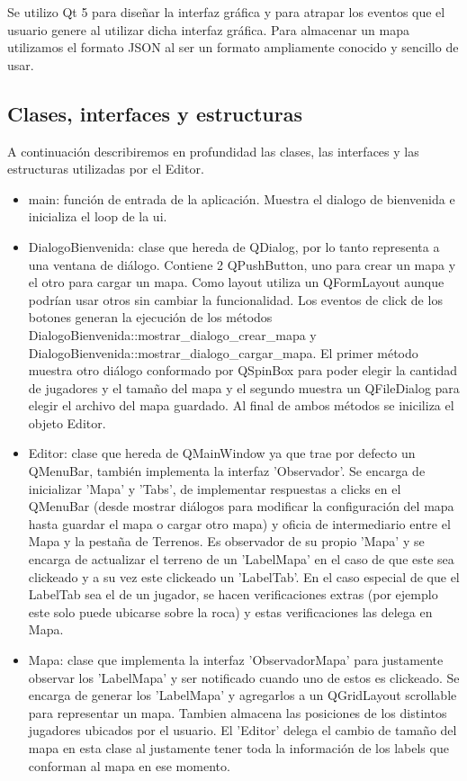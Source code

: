 \documentclass[titlepage,a4paper,12pt]{article}
\begin{document}
Se utilizo Qt 5 para diseñar la interfaz gráfica y para atrapar los eventos que el usuario genere al utilizar dicha interfaz gráfica. Para almacenar un mapa utilizamos el formato JSON al ser un formato ampliamente conocido y sencillo de usar.

\subsection{Clases, interfaces y estructuras}

A continuación describiremos en profundidad las clases, las interfaces y las estructuras utilizadas por el Editor.

\begin{itemize}

\item main: función de entrada de la aplicación. Muestra el dialogo de bienvenida e inicializa el loop de la ui.

\item DialogoBienvenida: clase que hereda de QDialog, por lo tanto representa a una ventana de diálogo. Contiene 2 QPushButton, uno para crear un mapa y el otro para cargar un mapa. Como layout utiliza un QFormLayout aunque podrían usar otros sin cambiar la funcionalidad. Los eventos de click de los botones generan la ejecución de los métodos DialogoBienvenida::mostrar\_dialogo\_crear\_mapa y DialogoBienvenida::mostrar\_dialogo\_cargar\_mapa. El primer método muestra otro diálogo conformado por QSpinBox para poder elegir la cantidad de jugadores y el tamaño del mapa y el segundo muestra un QFileDialog para elegir el archivo del mapa guardado. Al final de ambos métodos se iniciliza el objeto Editor.

\item Editor: clase que hereda de QMainWindow ya que trae por defecto un QMenuBar, también implementa la interfaz 'Observador'. Se encarga de inicializar 'Mapa' y 'Tabs', de implementar respuestas a clicks en el QMenuBar (desde mostrar diálogos para modificar la configuración del mapa hasta guardar el mapa o cargar otro mapa) y oficia de intermediario entre el Mapa y la pestaña de Terrenos. Es observador de su propio 'Mapa' y se encarga de actualizar el terreno de un 'LabelMapa' en el caso de que este sea clickeado y a su vez este clickeado un 'LabelTab'. En el caso especial de que el LabelTab sea el de un jugador, se hacen verificaciones extras (por ejemplo este solo puede ubicarse sobre la roca) y estas verificaciones las delega en Mapa. 

\item Mapa: clase que implementa la interfaz 'ObservadorMapa' para justamente observar los 'LabelMapa' y ser notificado cuando uno de estos es clickeado. Se encarga de generar los 'LabelMapa' y agregarlos a un QGridLayout scrollable para representar un mapa. Tambien almacena las posiciones de los distintos jugadores ubicados por el usuario. El 'Editor' delega el cambio de tamaño del mapa en esta clase al justamente tener toda la información de los labels que conforman al mapa en ese momento. 


\end{itemize}
\end{document}
